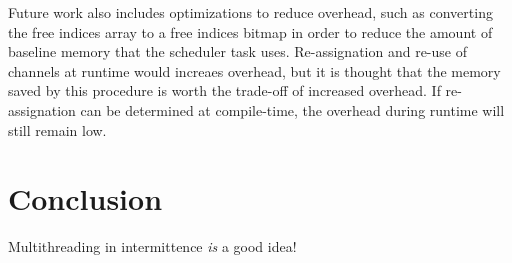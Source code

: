 \documentclass[11pt]{sensys-proc}
\begin{document}
Future work also includes optimizations to reduce overhead, such as converting the free indices array to a free indices bitmap in order to reduce the amount of
baseline memory that the scheduler task uses.
Re-assignation and re-use of channels at runtime would increaes overhead, but it is thought that the memory saved by this procedure is worth the trade-off of increased overhead.
If re-assignation can be determined at compile-time, the overhead during runtime will still remain low.

\section{Conclusion}
Multithreading in intermittence {\em is} a good idea!


\balance

\end{document}
